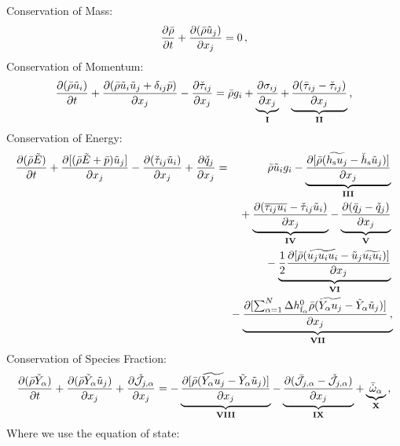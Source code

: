 Conservation of Mass:
\begin{equation}
  \label{eq:filt_mass} 
  \frac{\partial \bar{\rho}}{\partial t} + \frac{\partial (\bar{\rho} \tilde{u}_j )}{\partial x_j} = 0 \,,
\end{equation}
%
\indent Conservation of Momentum:
\begin{equation} 
  \label{eq:filt_momentum}
  \frac{\partial ( \bar{\rho} \tilde{u}_i )}{\partial t} 
  + \frac{\partial ( \bar{\rho} \tilde{u}_i \tilde{u}_j + \delta_{ij} \bar{p} )}{\partial x_j} 
  - \frac{\partial \check{\tau}_{ij}}{\partial x_j} 
  =  \bar{\rho} g_i 
  + \underbrace{\frac{\partial \sigma_{ij}}{\partial x_j}}_{\bf I}
  + \underbrace{\frac{\partial ( \bar{\tau}_{ij} - \check{\tau}_{ij} )}{\partial x_j}}_{\bf II} \,,
\end{equation}
%
\indent Conservation of Energy:
\begin{eqnarray}
  \label{eq:filt_energy}
  \Pfrac{( \bar{\rho} \tilde{E} )}{t} 
  + \Pfrac{[ (\bar{\rho} \tilde{E} + \bar{p}) \tilde{u}_j ]}{x_j}  
  - \Pfrac{( \check{\tau}_{ij} \tilde{u}_i )}{x_j}  
  + \Pfrac{\check{q}_j}{x_j} 
  & = & 
  \bar{\rho} \tilde{u}_i g_i
  - \underbrace{\Pfrac{[ \bar{\rho} (\widetilde{h_{\mathrm{s}} u_j} - \check{h}_{\mathrm{s}} \tilde{u}_j) ]}{x_j}
  }_{\bf III} 
  {} \nonumber \\  &  & {} 
  \!\!\!\!\! + \underbrace{\Pfrac{(\overline{\tau_{ij} u_i} - \check{\tau}_{ij} \tilde{u}_i)}{x_j}
  }_{\bf IV}
  - \underbrace{\Pfrac{(\bar{q}_j - \check{q}_j)}{x_j}}_{\bf V}
  {} \nonumber \\   &  & {} 
  \!\!\!\!\! - \underbrace{ \frac{1}{2} \Pfrac{[ \bar{\rho} (\widetilde{u_j u_i u_i}
      - \tilde{u}_j \widetilde{u_i u_i}) ]}{x_j}}_{\bf VI}
  {} \nonumber \\  &  & {}
  \!\!\!\!\! - \underbrace{\Pfrac{[ \sum_{\alpha=1}^N \Delta h^0_{\mathrm{f}_\alpha} \bar{\rho}
      (\widetilde{Y_\alpha u_{j}} - \tilde{Y}_\alpha \tilde{u}_j) ]}{x_j} \,,
  }_{\bf VII}
\end{eqnarray}
%
\indent Conservation of Species Fraction:
\begin{equation} 
  \label{eq:filt_species}
  \frac{\partial ( \bar{\rho} \tilde{Y}_\alpha )}{\partial t} 
  + \frac{\partial ( \bar{\rho} \tilde{Y}_\alpha \tilde{u}_j )}{\partial x_j}
  + \frac{\partial \check{\cal J}_{j,\alpha}}{\partial x_j} 
  = - \underbrace{\frac{\partial [ \bar{\rho}(\widetilde{Y_\alpha u_j} - 
                  \tilde{Y}_\alpha \tilde{u}_j) ]}{\partial x_j}}_{\bf VIII} 
  - \underbrace{\frac{\partial (\bar{\cal J}_{j,\alpha} - \check{\cal J}_{j,\alpha})}{\partial x_j}}_{\bf IX} 
  + \underbrace{\bar{\dot{\omega}}_\alpha}_{\bf X} \,,
\end{equation}
%
Where we use the equation of state:
